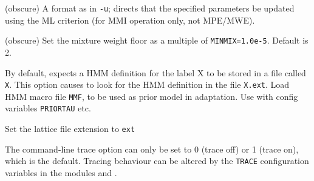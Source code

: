 \begin{optlist}
   (obscure) A format as in \texttt{-u}; directs that the specified parameters
     be updated using the ML criterion (for MMI operation only, not MPE/MWE).

   (obscure) Set the mixture weight floor as a multiple
    of \texttt{MINMIX=1.0e-5}.  Default is 2.

    By default,  expects a HMM definition for 
      the label X to be stored in a file called {\tt X}.  This
      option causes  to look for the HMM definition in the
      file {\tt X.ext}.
\stdoptB
\stdoptF
\stdoptH
{}  Load HMM macro file {\tt MMF}, to be used as prior model in adaptation.  Use with config variables {\tt PRIORTAU} etc.  
\stdoptI
\stdoptM

  Set the lattice file extension to {\tt ext}
\end{optlist}




The command-line trace option can only be set to 0 (trace off)
or 1 (trace on), which is the default.  Tracing behaviour can
be altered by the {\tt TRACE} configuration variables in the modules 
and .



